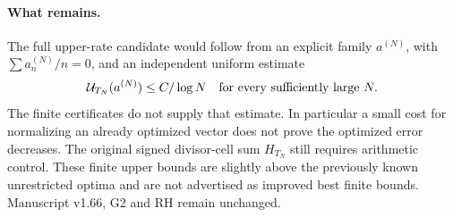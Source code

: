 \paragraph{What remains.}
The full upper-rate candidate would follow from an explicit family
$a^{(N)}$, with $\sum a_n^{(N)}/n=0$, and an independent uniform estimate
\[
 \mathcal U_{T_N}(a^{(N)})\le C/\log N
 \quad\hbox{for every sufficiently large }N.
\]
The finite certificates do not supply that estimate. In particular a small
cost for normalizing an already optimized vector does not prove the
optimized error decreases. The original signed divisor-cell sum $H_{T_N}$
still requires arithmetic control. These finite upper bounds are slightly
above the previously known unrestricted optima and are not advertised as
improved best finite bounds. Manuscript v1.66, G2 and RH remain unchanged.
